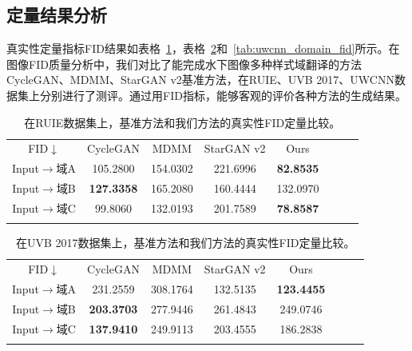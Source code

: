 \subsection{定量结果分析}
真实性定量指标FID结果如表格~\ref{tab:ruie_domain_fid}，表格~\ref{tab:uvb_domain_fid}和~\ref{tab:uwcnn_domain_fid}所示。在图像FID质量分析中，我们对比了能完成水下图像多种样式域翻译的方法CycleGAN、MDMM、StarGAN v2基准方法，在RUIE、UVB 2017、UWCNN数据集上分别进行了测评。通过用FID指标，能够客观的评价各种方法的生成结果。

\begin{table}[ht]
\centering
\caption{在RUIE数据集上，基准方法和我们方法的真实性FID定量比较。}
  \begin{tabular}{c|ccccccc}
    \hline\noalign{\smallskip}
    FID$\downarrow$ & CycleGAN & MDMM & StarGAN v2 & Ours \\
    \noalign{\smallskip}\hline\noalign{\smallskip}
    Input$\rightarrow$域A & 105.2800 & 154.0302 & 221.6996 & \textbf{82.8535}  \\
    Input$\rightarrow$域B & \textbf{127.3358} & 165.2080 & 160.4444 & 132.0970  \\
    Input$\rightarrow$域C & 99.8060 & 132.0193 & 201.7589 & \textbf{78.8587}  \\
    \noalign{\smallskip}\hline
  \end{tabular}
  \label{tab:ruie_domain_fid}
\end{table}

\begin{table}[ht]
\centering
\caption{在UVB 2017数据集上，基准方法和我们方法的真实性FID定量比较。}
  \begin{tabular}{c|ccccccc}
    \hline\noalign{\smallskip}
    FID$\downarrow$ & CycleGAN & MDMM & StarGAN v2 & Ours \\
    \noalign{\smallskip}\hline\noalign{\smallskip}
    Input$\rightarrow$域A & 231.2559 & 308.1764 & 132.5135 & \textbf{123.4455}  \\
    Input$\rightarrow$域B & \textbf{203.3703} & 277.9446 & 261.4843 & 249.0746  \\
    Input$\rightarrow$域C & \textbf{137.9410} & 249.9113 & 203.4555 & 186.2838  \\
    \noalign{\smallskip}\hline
  \end{tabular}
  \label{tab:uvb_domain_fid}
\end{table}

